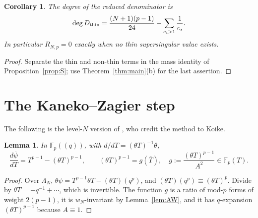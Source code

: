 \documentclass[11pt,a4paper]{article}
\numberwithin{equation}{section}
\newtheorem{lemma}[theorem]{Lemma}
\newtheorem{corollary}[theorem]{Corollary}
\theoremstyle{definition}
\theoremstyle{remark}
\newcommand{\Fp}{\mathbb F_p}
\begin{document}
\begin{corollary}\label{cor:degree}
The degree of the reduced denominator is
\[
\deg D_{\rm thin}=\frac{(N+1)(p-1)}{24}-\sum_{e_i>1}\frac1{e_i}.
\]
In particular $R_{N,p}=0$ exactly when no thin supersingular value exists.
\end{corollary}
\begin{proof}
Separate the thin and non-thin terms in the mass identity of
Proposition~\ref{prop:S}; use Theorem~\ref{thm:main}(b) for the last assertion.
\end{proof}

\section{The Kaneko--Zagier step}\label{sec:kz}

The following is the level-$N$ version of \citet[\S10, (35)--(38)]{KZ98}, who credit the method to Koike.

\begin{lemma}\label{lem:dpsi}
In $\Fp((q))$, with $d/dT=(\theta T)^{-1}\theta$,
\[
\frac{d\overline\psi}{dT}=T^{p-1}-(\theta T)^{p-1},\qquad (\theta T)^{p-1}=g(\overline T),\quad
g:=\frac{(\theta T)^{p-1}}{A^2}\in\Fp(T).
\]
\end{lemma}
\begin{proof}
Over $\Lambda_N$, $\theta\psi=T^{p-1}\theta T-(\theta T)(q^p)$, and $(\theta T)(q^p)\equiv(\theta T)^p$.
Divide by $\theta T=-q^{-1}+\cdots$, which is invertible. The function $g$ is a ratio of mod-$p$
forms of weight $2(p-1)$, it is $w_N$-invariant by Lemma~\ref{lem:AW}, and it has $q$-expansion
$(\theta T)^{p-1}$ because $A\equiv1$.
\end{proof}
\end{document}
